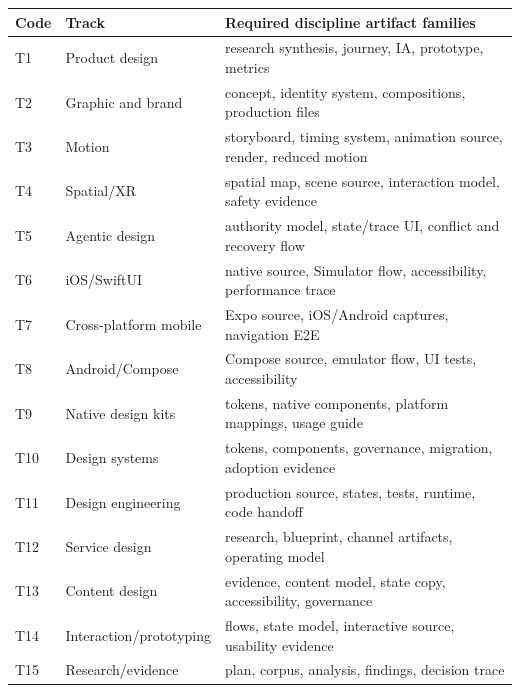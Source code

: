 \documentclass[10pt,twocolumn]{article}
\begin{document}
\begin{tabularx}{\textwidth}{@{}llX@{}}
\toprule
Code & Track & Required discipline artifact families \\
\midrule
T1 & Product design & research synthesis, journey, IA, prototype, metrics \\
T2 & Graphic and brand & concept, identity system, compositions, production files \\
T3 & Motion & storyboard, timing system, animation source, render, reduced motion \\
T4 & Spatial/XR & spatial map, scene source, interaction model, safety evidence \\
T5 & Agentic design & authority model, state/trace UI, conflict and recovery flow \\
T6 & iOS/SwiftUI & native source, Simulator flow, accessibility, performance trace \\
T7 & Cross-platform mobile & Expo source, iOS/Android captures, navigation E2E \\
T8 & Android/Compose & Compose source, emulator flow, UI tests, accessibility \\
T9 & Native design kits & tokens, native components, platform mappings, usage guide \\
T10 & Design systems & tokens, components, governance, migration, adoption evidence \\
T11 & Design engineering & production source, states, tests, runtime, code handoff \\
T12 & Service design & research, blueprint, channel artifacts, operating model \\
T13 & Content design & evidence, content model, state copy, accessibility, governance \\
T14 & Interaction/prototyping & flows, state model, interactive source, usability evidence \\
T15 & Research/evidence & plan, corpus, analysis, findings, decision trace \\
\bottomrule
\end{tabularx}
\end{document}
